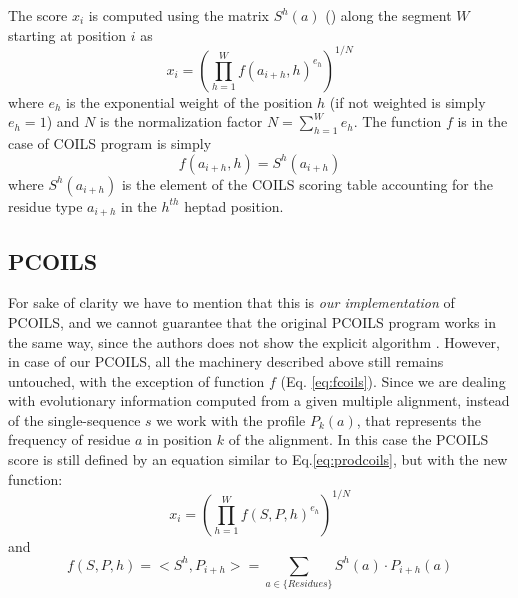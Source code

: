 \documentclass[11pt,english]{article}
\begin{document}
The score $x_i$ is computed using the matrix $S^h(a)$ (\cite{Lupas}) along the segment $W$ starting
at position $i$ as
\begin{equation}
x_i=(\prod_{h=1}^W f(a_{i+h},h)^{e_h})^{1/N}
\label{eq:prodcoils}
\end{equation}
where $e_h$ is the exponential weight of the position $h$ (if not weighted is simply $e_h=1$) and 
$N$ is the normalization factor $N=\sum_{h=1}^W e_h$. 
The function $f$ is in the case of COILS program is simply
\begin{equation}
f(a_{i+h},h)=S^h(a_{i+h})
\label{eq:fcoils}
\end{equation}
where $S^h(a_{i+h})$ is the element of the COILS scoring table 
accounting for the residue type $a_{i+h}$ in the $h^{th}$ heptad position.

\subsection{PCOILS}

For sake of clarity we have to mention that this is {\em our implementation} of PCOILS, and we cannot
guarantee that the original PCOILS program works in the same way, since the authors
does not show the explicit algorithm \cite{pcoils}. However, in case of our PCOILS, all the 
machinery described above still remains untouched, with the exception of function $f$ 
(Eq. \ref{eq:fcoils}). Since we are dealing with evolutionary information 
computed from a given multiple alignment, instead of the single-sequence $s$
we work with the profile $P_k(a)$, that represents the frequency of residue $a$ in position $k$ of 
the alignment.
In this case the PCOILS score is still defined by an equation similar to Eq.\ref{eq:prodcoils}, 
but with the new function:
\begin{equation}
x_i=(\prod_{h=1}^W f(S,P,h)^{e_h})^{1/N}
\label{eq:prodpcoils}
\end{equation}
and
\begin{equation}
f(S,P,h)=<S^h,P_{i+h}>=\sum_{a \in \{Residues\}} S^h(a)\cdot P_{i+h}(a)
\label{eq:fpcoils}
\end{equation}
\end{document}
